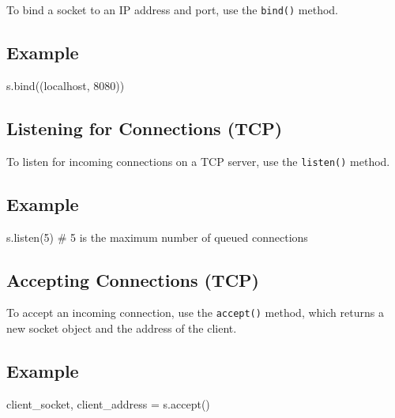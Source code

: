 \documentclass[
  letterpaper,
  DIV=11,
  numbers=noendperiod]{scrreprt}
\newenvironment{Shaded}{\begin{snugshade}}{\end{snugshade}}
\newcommand{\CommentTok}[1]{\textcolor[rgb]{0.37,0.37,0.37}{#1}}
\newcommand{\DecValTok}[1]{\textcolor[rgb]{0.68,0.00,0.00}{#1}}
\newcommand{\NormalTok}[1]{\textcolor[rgb]{0.00,0.23,0.31}{#1}}
\newcommand{\OperatorTok}[1]{\textcolor[rgb]{0.37,0.37,0.37}{#1}}
\newcommand{\StringTok}[1]{\textcolor[rgb]{0.13,0.47,0.30}{#1}}
\begin{document}
To bind a socket to an IP address and port, use the \texttt{bind()}
method.

\subsection{Example}\label{example-72}

\begin{Shaded}
\begin{Highlighting}[]
\NormalTok{s.bind((}\StringTok{\textquotesingle{}localhost\textquotesingle{}}\NormalTok{, }\DecValTok{8080}\NormalTok{))}
\end{Highlighting}
\end{Shaded}

\subsection{Listening for Connections
(TCP)}\label{listening-for-connections-tcp}

To listen for incoming connections on a TCP server, use the
\texttt{listen()} method.

\subsection{Example}\label{example-73}

\begin{Shaded}
\begin{Highlighting}[]
\NormalTok{s.listen(}\DecValTok{5}\NormalTok{)  }\CommentTok{\# 5 is the maximum number of queued connections}
\end{Highlighting}
\end{Shaded}

\subsection{Accepting Connections
(TCP)}\label{accepting-connections-tcp}

To accept an incoming connection, use the \texttt{accept()} method,
which returns a new socket object and the address of the client.

\subsection{Example}\label{example-74}

\begin{Shaded}
\begin{Highlighting}[]
\NormalTok{client\_socket, client\_address }\OperatorTok{=}\NormalTok{ s.accept()}
\end{Highlighting}
\end{Shaded}
\end{document}
